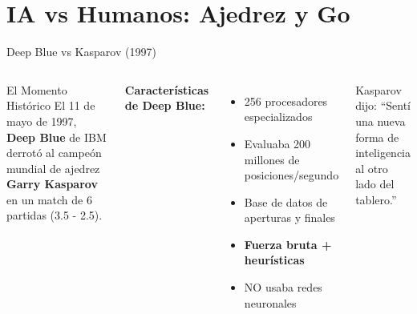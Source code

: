 \documentclass[aspectratio=169]{beamer}
\begin{document}
\section{IA vs Humanos: Ajedrez y Go}

\begin{frame}{Deep Blue vs Kasparov (1997)}
    \begin{columns}
        \begin{block}{El Momento Histórico}
            El 11 de mayo de 1997, \textbf{Deep Blue} de IBM derrotó al campeón mundial de ajedrez \textbf{Garry Kasparov} en un match de 6 partidas (3.5 - 2.5).
        \end{block}
        
        \vspace{0.3cm}
        \textbf{Características de Deep Blue:}
        \begin{itemize}
            \item 256 procesadores especializados
            \item Evaluaba 200 millones de posiciones/segundo
            \item Base de datos de aperturas y finales
            \item \textbf{Fuerza bruta + heurísticas}
            \item NO usaba redes neuronales
        \end{itemize}
        
        \centering
        
        \vspace{0.3cm}
        \begin{alertblock}{Kasparov dijo:}
            ``Sentí una nueva forma de inteligencia al otro lado del tablero.''
        \end{alertblock}
    \end{columns}
\end{frame}
\end{document}

